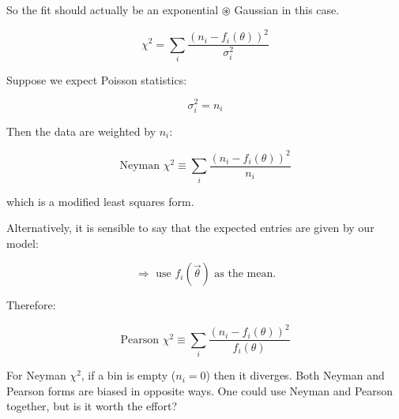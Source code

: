 \begin{itemize}
\begin{enumerate}
                        So the fit should actually be an exponential $\circledast$ Gaussian in this case.

                        \[
                              \chi^2 = \sum_i \frac{(n_i - f_i(\theta))^2}{\sigma_i^2}
                        \]

                        Suppose we expect Poisson statistics:

                        \[
                              \sigma_i^2 = n_i
                        \]

                        Then the data are weighted by $n_i$:

                        \[
                              \text{Neyman } \chi^2 \equiv \sum_i \frac{(n_i - f_i(\theta))^2}{n_i}
                        \]

                        which is a modified least squares form.

                        Alternatively, it is sensible to say that the expected entries are given by our model:

                        \[
                              \Rightarrow \text{ use } f_i(\vec{\theta}) \text{ as the mean.}
                        \]

                        Therefore:

                        \[
                              \text{Pearson } \chi^2 \equiv \sum_i \frac{(n_i - f_i(\theta))^2}{f_i(\theta)}
                        \]

                        For Neyman $\chi^2$, if a bin is empty ($n_i = 0$) then it diverges.
                        Both Neyman and Pearson forms are biased in opposite ways.
                        One could use Neyman and Pearson together, but is it worth the effort?
            \end{enumerate}
\end{itemize}
